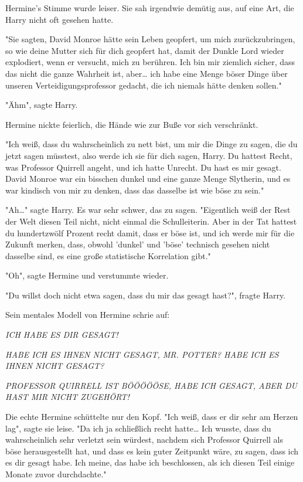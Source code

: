 {Hermine's Stimme wurde leiser. Sie sah irgendwie demütig aus, auf eine Art, die Harry nicht oft gesehen hatte.

"Sie sagten, David Monroe hätte sein Leben geopfert, um mich zurückzubringen, so wie deine Mutter sich für dich geopfert hat, damit der Dunkle Lord wieder explodiert, wenn er versucht, mich zu berühren. Ich bin mir ziemlich sicher, dass das nicht die ganze Wahrheit ist, aber… ich habe eine Menge böser Dinge über unseren Verteidigungsprofessor gedacht, die ich niemals hätte denken sollen."

"Ähm", sagte Harry.

Hermine nickte feierlich, die Hände wie zur Buße vor sich verschränkt.

"Ich weiß, dass du wahrscheinlich zu nett bist, um mir die Dinge zu sagen, die du jetzt sagen müsstest, also werde ich sie für dich sagen, Harry. Du hattest Recht, was Professor Quirrell angeht, und ich hatte Unrecht. Du hast es mir gesagt. David Monroe war ein bisschen dunkel und eine ganze Menge Slytherin, und es war kindisch von mir zu denken, dass das dasselbe ist wie böse zu sein."

"Ah…" sagte Harry. Es war sehr schwer, das zu sagen. "Eigentlich weiß der Rest der Welt diesen Teil nicht, nicht einmal die Schulleiterin. Aber in der Tat hattest du hundertzwölf Prozent recht damit, dass er böse ist, und ich werde mir für die Zukunft merken, dass, obwohl 'dunkel' und 'böse' technisch gesehen nicht dasselbe sind, es eine große statistische Korrelation gibt."

"Oh", sagte Hermine und verstummte wieder.

"Du willst doch nicht etwa sagen, dass du mir das gesagt hast?", fragte Harry.

Sein mentales Modell von Hermine schrie auf:

\emph{ICH HABE ES DIR GESAGT!}

\emph{HABE ICH ES IHNEN NICHT GESAGT, MR. POTTER? HABE ICH ES IHNEN NICHT GESAGT?}

\emph{PROFESSOR QUIRRELL IST BÖÖÖÖÖSE, HABE ICH GESAGT, ABER DU HAST MIR NICHT ZUGEHÖRT!}

Die echte Hermine schüttelte nur den Kopf. "Ich weiß, dass er dir sehr am Herzen lag", sagte sie leise. "Da ich ja schließlich recht hatte… Ich wusste, dass du wahrscheinlich sehr verletzt sein würdest, nachdem sich Professor Quirrell als böse herausgestellt hat, und dass es kein guter Zeitpunkt wäre, zu sagen, dass ich es dir gesagt habe. Ich meine, das habe ich beschlossen, als ich diesen Teil einige Monate zuvor durchdachte."

}
